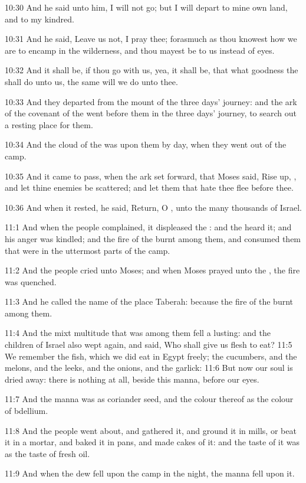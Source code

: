 10:30 And he said unto him, I will not go; but I will depart to mine own land, and to my kindred.

10:31 And he said, Leave us not, I pray thee; forasmuch as thou knowest how we are to encamp in the wilderness, and thou mayest be to us instead of eyes.

10:32 And it shall be, if thou go with us, yea, it shall be, that what goodness the \LORD shall do unto us, the same will we do unto thee.

10:33 And they departed from the mount of the \LORD three days' journey: and the ark of the covenant of the \LORD went before them in the three days' journey, to search out a resting place for them.

10:34 And the cloud of the \LORD was upon them by day, when they went out of the camp.

10:35 And it came to pass, when the ark set forward, that Moses said, Rise up, \LORD, and let thine enemies be scattered; and let them that hate thee flee before thee.

10:36 And when it rested, he said, Return, O \LORD, unto the many thousands of Israel.

11:1 And when the people complained, it displeased the \LORD: and the \LORD heard it; and his anger was kindled; and the fire of the \LORD burnt among them, and consumed them that were in the uttermost parts of the camp.

11:2 And the people cried unto Moses; and when Moses prayed unto the \LORD, the fire was quenched.

11:3 And he called the name of the place Taberah: because the fire of the \LORD burnt among them.

11:4 And the mixt multitude that was among them fell a lusting: and the children of Israel also wept again, and said, Who shall give us flesh to eat?  11:5 We remember the fish, which we did eat in Egypt freely; the cucumbers, and the melons, and the leeks, and the onions, and the garlick: 11:6 But now our soul is dried away: there is nothing at all, beside this manna, before our eyes.

11:7 And the manna was as coriander seed, and the colour thereof as the colour of bdellium.

11:8 And the people went about, and gathered it, and ground it in mills, or beat it in a mortar, and baked it in pans, and made cakes of it: and the taste of it was as the taste of fresh oil.

11:9 And when the dew fell upon the camp in the night, the manna fell upon it.


